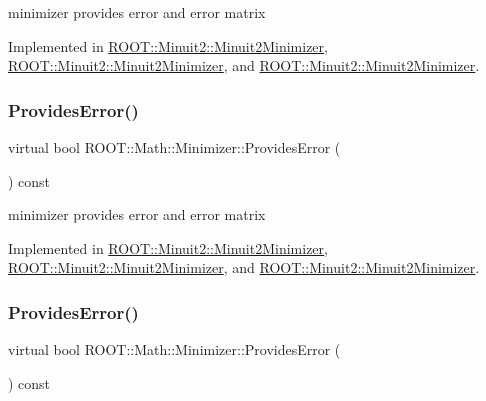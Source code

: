 minimizer provides error and error matrix 



Implemented in \mbox{\hyperlink{classROOT_1_1Minuit2_1_1Minuit2Minimizer_a3a3a8abea38285fe639f2f0ec5505533}{R\+O\+O\+T\+::\+Minuit2\+::\+Minuit2\+Minimizer}}, \mbox{\hyperlink{classROOT_1_1Minuit2_1_1Minuit2Minimizer_a3a3a8abea38285fe639f2f0ec5505533}{R\+O\+O\+T\+::\+Minuit2\+::\+Minuit2\+Minimizer}}, and \mbox{\hyperlink{classROOT_1_1Minuit2_1_1Minuit2Minimizer_a3a3a8abea38285fe639f2f0ec5505533}{R\+O\+O\+T\+::\+Minuit2\+::\+Minuit2\+Minimizer}}.

\mbox{\label{classROOT_1_1Math_1_1Minimizer_a71837caa295c76303c1a14679be1898d}} 
\subsubsection{\texorpdfstring{ProvidesError()}{ProvidesError()}\hspace{0.1cm}{\footnotesize\ttfamily [2/3]}}
{\footnotesize\ttfamily virtual bool R\+O\+O\+T\+::\+Math\+::\+Minimizer\+::\+Provides\+Error (\begin{DoxyParamCaption}{ }\end{DoxyParamCaption}) const\hspace{0.3cm}{\ttfamily [pure virtual]}}



minimizer provides error and error matrix 



Implemented in \mbox{\hyperlink{classROOT_1_1Minuit2_1_1Minuit2Minimizer_a3a3a8abea38285fe639f2f0ec5505533}{R\+O\+O\+T\+::\+Minuit2\+::\+Minuit2\+Minimizer}}, \mbox{\hyperlink{classROOT_1_1Minuit2_1_1Minuit2Minimizer_a3a3a8abea38285fe639f2f0ec5505533}{R\+O\+O\+T\+::\+Minuit2\+::\+Minuit2\+Minimizer}}, and \mbox{\hyperlink{classROOT_1_1Minuit2_1_1Minuit2Minimizer_a3a3a8abea38285fe639f2f0ec5505533}{R\+O\+O\+T\+::\+Minuit2\+::\+Minuit2\+Minimizer}}.

\mbox{\label{classROOT_1_1Math_1_1Minimizer_a71837caa295c76303c1a14679be1898d}} 
\subsubsection{\texorpdfstring{ProvidesError()}{ProvidesError()}\hspace{0.1cm}{\footnotesize\ttfamily [3/3]}}
{\footnotesize\ttfamily virtual bool R\+O\+O\+T\+::\+Math\+::\+Minimizer\+::\+Provides\+Error (\begin{DoxyParamCaption}{ }\end{DoxyParamCaption}) const\hspace{0.3cm}{\ttfamily [pure virtual]}}



